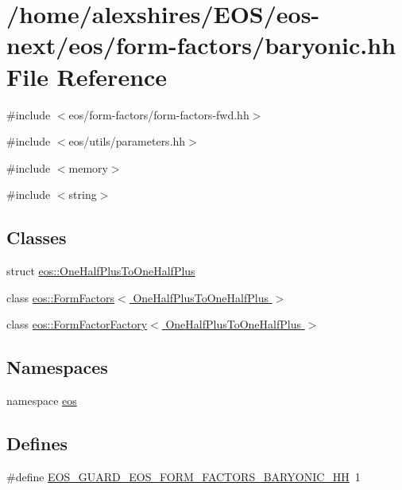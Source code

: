 \hypertarget{baryonic_8hh}{
\section{/home/alexshires/EOS/eos-\/next/eos/form-\/factors/baryonic.hh File Reference}
\label{baryonic_8hh}
}
{\ttfamily \#include $<$eos/form-\/factors/form-\/factors-\/fwd.hh$>$}\par
{\ttfamily \#include $<$eos/utils/parameters.hh$>$}\par
{\ttfamily \#include $<$memory$>$}\par
{\ttfamily \#include $<$string$>$}\par
\subsection*{Classes}
\begin{DoxyCompactItemize}
\item 
struct \hyperlink{structeos_1_1OneHalfPlusToOneHalfPlus}{eos::OneHalfPlusToOneHalfPlus}
\item 
class \hyperlink{classeos_1_1FormFactors_3_01OneHalfPlusToOneHalfPlus_01_4}{eos::FormFactors$<$ OneHalfPlusToOneHalfPlus $>$}
\item 
class \hyperlink{classeos_1_1FormFactorFactory_3_01OneHalfPlusToOneHalfPlus_01_4}{eos::FormFactorFactory$<$ OneHalfPlusToOneHalfPlus $>$}
\end{DoxyCompactItemize}
\subsection*{Namespaces}
\begin{DoxyCompactItemize}
\item 
namespace \hyperlink{namespaceeos}{eos}
\end{DoxyCompactItemize}
\subsection*{Defines}
\begin{DoxyCompactItemize}
\item 
\#define \hyperlink{baryonic_8hh_adc69da981be18d2928e9835a1e565e35}{EOS\_\-GUARD\_\-EOS\_\-FORM\_\-FACTORS\_\-BARYONIC\_\-HH}~1
\end{DoxyCompactItemize}



